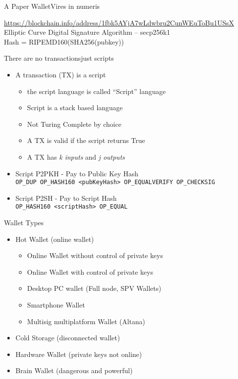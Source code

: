\documentclass[english,compress]{beamer}
\begin{document}
\begin{frame}{A Paper Wallet}{Vires in numeris}
 \vfill
 \begin{tiny}
 \url{https://blockchain.info/address/1fbk5AYjA7wLdwbru2CunWEuToBu1USsX}
 \vfill
 \vfill
 Elliptic Curve Digital Signature Algorithm -- secp256k1 \\
 Hash = RIPEMD160(SHA256(pubkey))
\end{tiny}
\end{frame}

\begin{frame}{There are no transactions}{just scripts}
 \begin{itemize}
  \item A transaction (TX) is a script
  \begin{itemize}
    \item the script language is called ``Script'' language
    \item Script is a stack based language
    \item Not Turing Complete by choice
    \item A TX is valid if the script returns True
    \item A TX has \emph{k inputs} and \emph{j outputs}
   \end{itemize}
  
  \item Script P2PKH - Pay to Public Key Hash \\ 
      \texttt{OP\_DUP OP\_HASH160 <pubKeyHash> OP\_EQUALVERIFY OP\_CHECKSIG}
  \item Script P2SH - Pay to Script Hash \\ 
      \texttt{OP\_HASH160 <scriptHash> OP\_EQUAL}
 \end{itemize}
\end{frame}

\begin{frame}{Wallet Types}
 \begin{itemize}
  \item Hot Wallet (online wallet)
  \begin{itemize}
    \item Online Wallet without control of private keys	
    \item Online Wallet with control of private keys
    \item Desktop PC wallet (Full node, SPV Wallets)
    \item Smartphone Wallet
    \item Multisig multiplatform Wallet (Altana)
  \end{itemize}
  
  \item Cold Storage (disconnected wallet)
  \item Hardware Wallet (private keys not online)
  \item Brain Wallet (dangerous and powerful)
 \end{itemize}

\end{frame}
\end{document}
